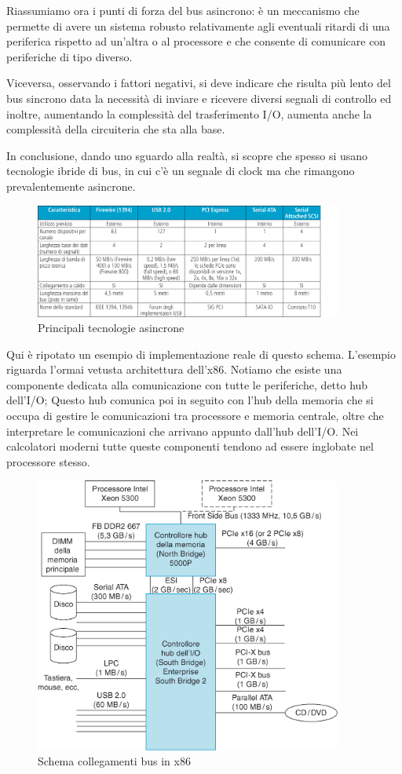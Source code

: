\documentclass[class=book, crop=false, oneside]{standalone}
\begin{document}
Riassumiamo ora i punti di forza del bus asincrono: è un meccanismo che permette di avere un sistema robusto relativamente agli eventuali ritardi di una periferica rispetto ad un'altra o al processore e che consente di comunicare con periferiche di tipo diverso.

Viceversa, osservando i fattori negativi, si deve indicare che risulta più lento del bus sincrono data la necessità di inviare e ricevere diversi segnali di controllo ed inoltre, aumentando la complessità del trasferimento I/O, aumenta anche la complessità della circuiteria che sta alla base.

In conclusione, dando uno sguardo alla realtà, si scopre che spesso si usano tecnologie ibride di bus, in cui c'è un segnale di clock ma che rimangono prevalentemente asincrone.

\begin{figure}[!h]
	\centering
	\includegraphics[width=0.9\textwidth,keepaspectratio]{tecnologie-asincrone}
	\caption{Principali tecnologie asincrone}
\end{figure}
Qui è ripotato un esempio di implementazione reale di questo schema. L'esempio riguarda l'ormai vetusta architettura dell'x86. Notiamo che esiste una componente dedicata alla comunicazione con tutte le periferiche, detto hub dell'I/O; Questo hub comunica poi in seguito con l'hub della memoria che si occupa di gestire le comunicazioni tra processore e memoria centrale, oltre che interpretare le comunicazioni che arrivano appunto dall'hub dell'I/O.
Nei calcolatori moderni tutte queste componenti tendono ad essere inglobate nel processore stesso.
\begin{figure}[!h]
	\centering
	\includegraphics[width=0.9\textwidth,keepaspectratio]{esempio-x86}
	\caption{Schema collegamenti bus in x86}
\end{figure}
\end{document}
